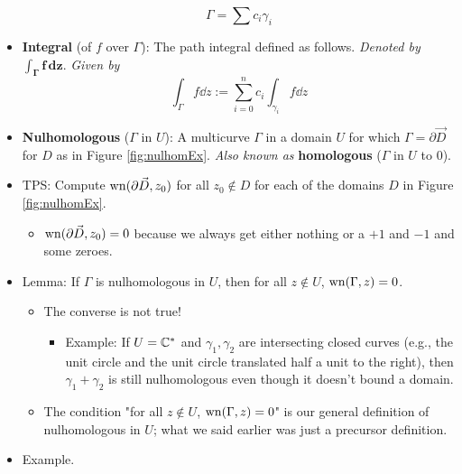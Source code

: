 \documentclass[../notes.tex]{subfiles}
\begin{document}
\begin{itemize}
    \begin{equation*}
        \Gamma = \sum c_i\gamma_i
    \end{equation*}
    \item \textbf{Integral} (of $f$ over $\Gamma$): The path integral defined as follows. \emph{Denoted by} $\bm{\int_\Gamma f\,\textbf{d}z}$. \emph{Given by}
    \begin{equation*}
        \int_\Gamma f\dd{z} := \sum_{i=0}^nc_i\int_{\gamma_i}f\dd{z}
    \end{equation*}
    \item \textbf{Nulhomologous} ($\Gamma$ in $U$): A multicurve $\Gamma$ in a domain $U$ for which $\Gamma=\partial\vec{D}$ for $D$ as in Figure \ref{fig:nulhomEx}. \emph{Also known as} \textbf{homologous} ($\Gamma$ in $U$ to 0).
    \item TPS: Compute $\operatorname{wn}(\partial\vec{D},z_0)$ for all $z_0\notin D$ for each of the domains $D$ in Figure \ref{fig:nulhomEx}.
    \begin{itemize}
        \item $\operatorname{wn}(\partial\vec{D},z_0)=0$ because we always get either nothing or a $+1$ and $-1$ and some zeroes.
    \end{itemize}
    \item Lemma: If $\Gamma$ is nulhomologous in $U$, then for all $z\notin U$, $\operatorname{wn}(\Gamma,z)=0$.
    \begin{itemize}
        \item The converse is not true!
        \begin{itemize}
            \item Example: If $U=\mathbb{C}^*$ and $\gamma_1,\gamma_2$ are intersecting closed curves (e.g., the unit circle and the unit circle translated half a unit to the right), then $\gamma_1+\gamma_2$ is still nulhomologous even though it doesn't bound a domain.
        \end{itemize}
        \item The condition "for all $z\notin U$, $\operatorname{wn}(\Gamma,z)=0$" is our general definition of nulhomologous in $U$; what we said earlier was just a precursor definition.
    \end{itemize}
    \item Example.
    \begin{figure}[h!]
        \centering
\end{figure}
\end{itemize}
\end{document}
